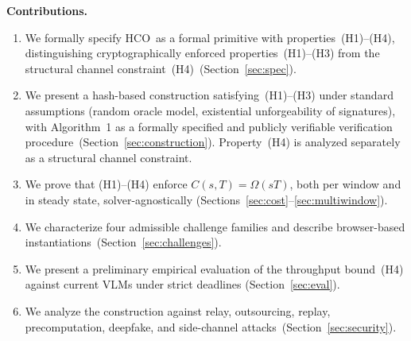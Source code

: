 \documentclass[11pt]{article}
\newcommand{\HCO}{HCO\xspace}
\theoremstyle{remark}
\theoremstyle{plain}
\begin{document}
	\noindent\textbf{Contributions.}
	\begin{enumerate}
		\item We formally specify \HCO\ as a formal primitive with
		properties~(H1)--(H4), distinguishing cryptographically
		enforced properties~(H1)--(H3) from the structural channel
		constraint~(H4)~(Section~\ref{sec:spec}).
		\item We present a hash-based construction satisfying~(H1)--(H3)
		under standard assumptions (random oracle model, existential
		unforgeability of signatures), with Algorithm~1 as a formally
		specified and publicly verifiable verification
		procedure~(Section~\ref{sec:construction}). Property~(H4) is
		analyzed separately as a structural channel constraint.
		\item We prove that (H1)--(H4) enforce $C(s,T) = \Omega(sT)$,
		both per window and in steady state, solver-agnostically
		(Sections~\ref{sec:cost}--\ref{sec:multiwindow}).
		\item We characterize four admissible challenge families and
		describe browser-based instantiations~(Section~\ref{sec:challenges}).
		\item We present a preliminary empirical evaluation of the throughput
		bound~(H4) against current VLMs under strict deadlines
		(Section~\ref{sec:eval}).
		\item We analyze the construction against relay, outsourcing,
		replay, precomputation, deepfake, and side-channel
		attacks~(Section~\ref{sec:security}).
	\end{enumerate}
	
\end{document}

